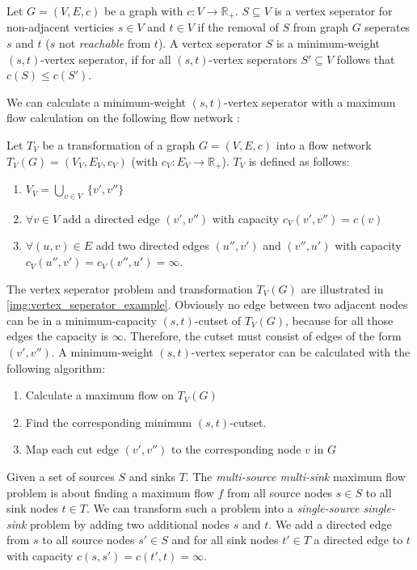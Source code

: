 \begin{definition}
Let $G = (V,E,c)$ be a graph with $c: V \rightarrow \mathbb{R}_+$. $S \subseteq V$
is a vertex seperator for non-adjacent verticies $s \in V$ and $t \in V$ if the
removal of $S$ from graph $G$ seperates $s$ and $t$ ($s$ not \emph{reachable} from $t$).
A vertex seperator $S$ is a minimum-weight $(s,t)$-vertex seperator, if for all 
$(s,t)$-vertex seperators $S' \subseteq V$ follows that $c(S) \le c(S')$.
\end{definition}

We can calculate a minimum-weight $(s,t)$-vertex seperator with a maximum flow
calculation on the following flow network \cite{west2001introduction}:

\begin{definition}
\label{def:vertex_seperator_transformation}
Let $T_V$ be a transformation of a graph $G = (V,E,c)$ into 
a flow network $T_V(G) = (V_V, E_V, c_V)$ (with $c_V: E_V \rightarrow \mathbb{R}_+$). 
$T_V$ is defined as follows:
\begin{enumerate}
\item $V_V = \bigcup\limits_{v \in V}\ \{v', v''\}$
\item $\forall v \in V$ add a directed edge $(v',v'')$
      with capacity $c_V(v',v'') = c(v)$
\item $\forall (u,v) \in E$ add two directed edges $(u'', v')$ and 
      $(v'', u')$ with capacity $c_V(u'', v') = c_V(v'', u') = \infty$.
\end{enumerate} 
\end{definition}

The vertex seperator problem and transformation $T_V(G)$ are illustrated in \autoref{img:vertex_seperator_example}.
Obviously no edge between two adjacent nodes can be in a minimum-capacity $(s,t)$-cutset of $T_V(G)$,
because for all those edges the capacity is $\infty$. Therefore, the cutset must consist
of edges of the form $(v',v'')$. A minimum-weight $(s,t)$-vertex seperator can be calculated with
the following algorithm:
\begin{enumerate}
\item Calculate a maximum flow  on $T_V(G)$
\item Find the corresponding minimum $(s,t)$-cutset.
\item Map each cut edge $(v',v'')$ to the corresponding node $v$ in $G$
\end{enumerate}
Given a set of sources $S$ and sinks $T$. The \emph{multi-source multi-sink} maximum flow problem is
about finding a maximum flow $f$ from all source nodes $s \in S$ to all sink nodes $t \in T$.
We can transform such a problem into a \emph{single-source single-sink} problem by adding
two additional nodes $s$ and $t$. We add a directed edge from $s$ to all source nodes $s' \in S$ 
and for all sink nodes $t' \in T$ a directed edge to $t$ with capacity 
$c(s,s') = c(t',t) = \infty$.

